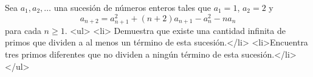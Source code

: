 Sea $a_1, a_2, \dots$ una sucesión de números enteros tales que $a_1 = 1$, $a_2 = 2$ y 
\[a_{n+2} =a^2_{n+1} +(n+2)a_{n+1} -a^2_n -na_n\] para cada $n \geq 1$.
<ul>
<li> Demuestra que existe una cantidad infinita de primos que dividen a al menos un término de esta sucesión.</li>
<li>Encuentra tres primos diferentes que no dividen a ningún término de esta sucesión.</li>
</ul>
